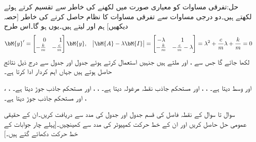 حل:تفرقی مساوات کو معیاری صورت میں لکھنے کی خاطر  سے تقسیم کرتے  ہوئے  لکھتے ہیں۔دو درجی مساوات سے تفرقی مساوات کا نظام حاصل کرنے کی خاطر [حصہ  دیکھیں] ہم  اور  لیتے ہیں۔یوں 
 ہو گا۔اس طرح
\begin{align*}
\bM{y}'=\begin{bmatrix*}[r] 0&1\\-\frac{k}{m}&-\frac{c}{m}  \end{bmatrix*} \bM{y},\quad  \abs{\bM{A}-\lambda\bM{I}}=\begin{bmatrix} -\lambda&1\\-\frac{k}{m}&-\frac{c}{m}-\lambda \end{bmatrix}=\lambda^2+\frac{c}{m}\lambda+\frac{k}{m}=0
\end{align*}
لکھا جائے گا جس سے ،  اور  ملتے ہیں جنہیں استعمال کرتے ہوئے جدول  اور جدول  سے درج ذیل نتائج حاصل ہوتے ہیں جہاں  اہم کردار ادا کرتا ہے۔
\begin{itemize}
 ،  اور   وسط دیتا ہے۔
  ، ،  اور  مستحکم جاذب نقطہ مرغولہ دیتا ہے۔
 ، ،  اور   مستحکم جاذب جوڑ دیتا ہے۔
 ، ،  اور  مستحکم جاذب جوڑ دیتا ہے۔
\end{itemize}

سوال  تا سوال  کے نقطہ فاصل کی قسم جدول  اور جدول  کی مدد سے  دریافت کریں۔ان کے حقیقی عمومی حل حاصل کریں اور ان کے خط حرکت کمپیوٹر کی مدد سے کھینچیں۔[پہلے چار جوابات کے خط حرکت دکھائے گئے ہیں۔]

